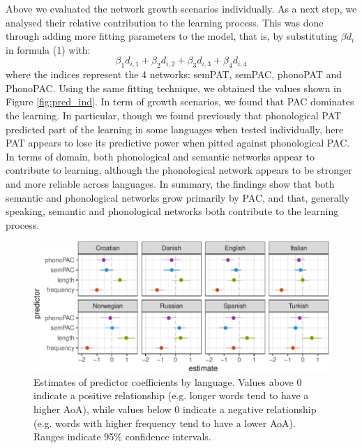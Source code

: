 \documentclass[10pt, letterpaper]{article}
\newenvironment{CodeChunk}{}{}
\begin{document}
Above we evaluated the network growth scenarios individually. As a next
step, we analysed their relative contribution to the learning process.
This was done through adding more fitting parameters to the model, that
is, by substituting \(\beta d_i\) in formula (1) with:
\[\beta_{1} d_{i, 1} + \beta_{2} d_{i, 2} + \beta_{3} d_{i, 3} + \beta_{4} d_{i, 4}\]
where the indices represent the 4 networks: semPAT, semPAC, phonoPAT and
PhonoPAC. Using the same fitting technique, we obtained the values shown
in Figure \ref{fig:pred_ind}. In term of growth scenarios, we found that
PAC dominates the learning. In particular, though we found previously
that phonological PAT predicted part of the learning in some languages
when tested individually, here PAT appears to lose its predictive power
when pitted against phonological PAC. In terms of domain, both
phonological and semantic networks appear to contribute to learning,
although the phonological network appears to be stronger and more
reliable across languages. In summary, the findings show that both
semantic and phonological networks grow primarily by PAC, and that,
generally speaking, semantic and phonological networks both contribute
to the learning process.

\begin{CodeChunk}
\begin{figure}[h]

{\centering \includegraphics{figs/regressions_img-1} 

}

\caption{\label{fig:regressions_img}Estimates of predictor coefficients by language. Values above 0 indicate a positive relationship (e.g. longer words tend to have a higher AoA), while values below 0 indicate a negative relationship (e.g. words with higher frequency tend to have a lower AoA). Ranges indicate 95\% confidence intervals.}\label{fig:regressions_img}
\end{figure}
\end{CodeChunk}
\end{document}
